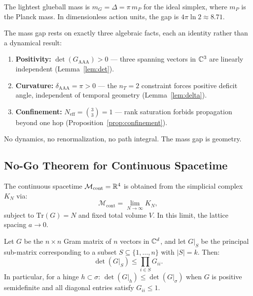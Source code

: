 \begin{corollary}
The lightest glueball mass is $m_G = \Delta = \pi\, m_P$ for the
ideal simplex, where $m_P$ is the Planck mass.  In dimensionless
action units, the gap is $4\pi\ln 2 \approx 8.71$.
\end{corollary}

\begin{remark}
The mass gap rests on exactly three algebraic facts, each an identity
rather than a dynamical result:
\begin{enumerate}
\item[(i)] \textbf{Positivity:} $\det(G_{\mathrm{AAA}}) > 0$ --- three
  spanning vectors in $\mathbb{C}^3$ are linearly independent
  (Lemma~\ref{lem:det}).
\item[(ii)] \textbf{Curvature:} $\delta_{\mathrm{AAA}} = \pi > 0$ ---
  the $n_T = 2$ constraint forces positive deficit angle, independent
  of temporal geometry (Lemma~\ref{lem:delta}).
\item[(iii)] \textbf{Confinement:} $N_{\mathrm{eff}} = \binom{3}{3} = 1$
  --- rank saturation forbids propagation beyond one hop
  (Proposition~\ref{prop:confinement}).
\end{enumerate}
No dynamics, no renormalization, no path integral.  The mass gap is
geometry.
\end{remark}

\subsection{No-Go Theorem for Continuous Spacetime}
\label{sec:nogo}

\begin{definition}
\label{def:continuum}
The continuous spacetime $\mathcal{M}_{\mathrm{cont}} = \mathbb{R}^4$ is
obtained from the simplicial complex $K_N$ via:
\begin{equation}
\mathcal{M}_{\mathrm{cont}} = \lim_{N \to \infty} K_N,
\end{equation}
subject to $\mathrm{Tr}(G) = N$ and fixed total volume $V$.
In this limit, the lattice spacing $a \to 0$.
\end{definition}

\begin{lemma}
\label{lem:subdet}
Let $G$ be the $n \times n$ Gram matrix of $n$ vectors in $\mathbb{C}^d$,
and let $G|_S$ be the principal sub-matrix corresponding to a subset
$S \subseteq \{1, \ldots, n\}$ with $|S| = k$.  Then:
\begin{equation}
\det(G|_S) \leq \prod_{i \in S} G_{ii}.
\end{equation}
In particular, for a hinge $h \subset \sigma$:
$\det(G|_h) \leq \det(G|_\sigma)$ when $G$ is positive semidefinite
and all diagonal entries satisfy $G_{ii} \leq 1$.
\end{lemma}

